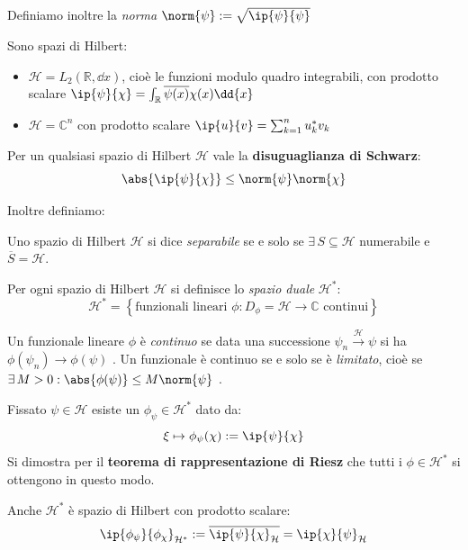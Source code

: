 Definiamo inoltre la \textit{norma} \(\norm{\psi}: = \sqrt{\ip{\psi}{\psi} }\)

\begin{example}
    Sono spazi di Hilbert:
    \begin{itemize}
        \item \(\mathcal{H}= L_2(\mathbb{R},\dd{x})\), cioè le funzioni modulo quadro integrabili, con prodotto scalare \(\ip{\psi}{\chi}= \int_{\mathbb{R}} \overline{\psi(x)}\chi(x)\dd{x}\)
        \item \(\mathcal{H}= \mathbb{C}^n\) con prodotto scalare \(\ip{u}{v}= \sum_{k=1}^{n} u_k^* v_k\)
    \end{itemize}
\end{example}

Per un qualsiasi spazio di Hilbert \(\mathcal{H}\) vale la \textbf{disuguaglianza di Schwarz}:
\begin{equation}
    \abs{\ip{\psi}{\chi}}\leq \norm{\psi}\norm{\chi}
\end{equation}

Inoltre definiamo:
\begin{definition}
    Uno spazio di Hilbert \(\mathcal{H}\) si dice \textit{separabile} se e solo se \(\exists \, S \subseteq \mathcal{H}\) numerabile e \(\overline{S}= \mathcal{H}\).
\end{definition}
\begin{definition}
    Per ogni spazio di Hilbert \(\mathcal{H}\) si definisce lo \textit{spazio duale} \(\mathcal{H}^* \):
    \[
    \mathcal{H}^*= \left\{ \text{funzionali lineari }\phi: D_\phi = \mathcal{H}\to \mathbb{C} \text{ continui}\right\}
    \]
\end{definition}
\begin{definition}
    Un funzionale lineare \(\phi\) è \textit{continuo} se data una successione \(\psi_n \overset{\mathcal{H}}{\to} \psi\) si ha \(\phi(\psi_n)\to \phi(\psi)\) .
    Un funzionale è continuo se e solo se è \textit{limitato}, cioè se \(\exists\, M> 0 : \abs{\phi(\psi)} \leq M \norm{\psi}\) .
\end{definition}


\begin{example}
    Fissato \(\psi\in \mathcal{H}\) esiste un \(\phi_\psi \in \mathcal{H}^*\) dato da:
    \begin{equation}
        \xi\mapsto \phi_\psi(\chi):= \ip{\psi}{\chi}
    \end{equation}
    Si dimostra per il \textbf{teorema di rappresentazione di Riesz} che tutti i \(\phi \in \mathcal{H}^*\) si ottengono in questo modo.

    \begin{remark}
        Anche \(\mathcal{H}^*\) è spazio di Hilbert con prodotto scalare:
        \[
        \ip{\phi_\psi}{\phi_\chi}_{\mathcal{H}^*}:= \overline{\ip{\psi}{\chi}_\mathcal{H}}= \ip{\chi}{\psi}_\mathcal{H}
        \]
    \end{remark}
\end{example}


